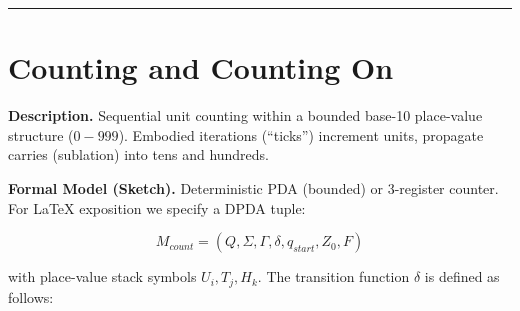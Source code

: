 \documentclass[
]{article}
\begin{document}
\begin{center}\rule{0.5\linewidth}{0.5pt}\end{center}

\section{Counting and Counting On}\label{counting-and-counting-on}

\textbf{Description.} Sequential unit counting within a bounded base-10
place-value structure (\(0-999\)). Embodied iterations (``ticks'')
increment units, propagate carries (sublation) into tens and hundreds.

\textbf{Formal Model (Sketch).} Deterministic PDA (bounded) or
3-register counter. For LaTeX exposition we specify a DPDA tuple:

\[M_{count} = (Q, \Sigma, \Gamma, \delta, q_{start}, Z_0, F)\]

with place-value stack symbols \(U_i, T_j, H_k\). The transition
function \(\delta\) is defined as follows:
\end{document}
